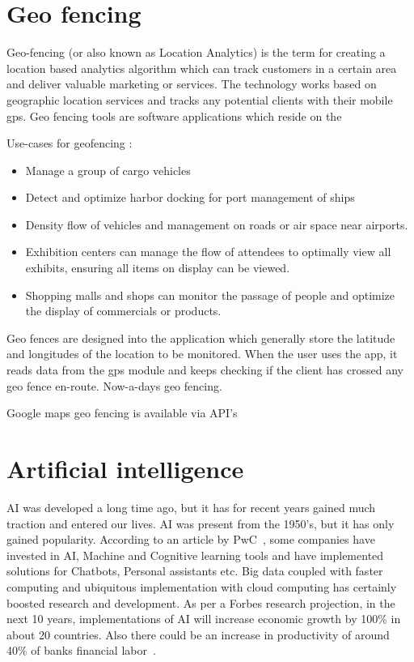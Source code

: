 %
%
%
%
\section{Geo fencing}
Geo-fencing (or also known as Location Analytics) is the term for creating a location based analytics algorithm which can track customers in a certain area and deliver valuable marketing or services. The technology works based on geographic location services and tracks any potential clients with their mobile gps. 
Geo fencing tools are software applications which reside on the 

Use-cases for geofencing :
\begin{itemize}
	\item Manage a group of cargo vehicles
	\item Detect and optimize harbor docking for port management of ships
	\item Density flow of vehicles and management on roads or air space near airports.
	\item Exhibition centers can manage the flow of attendees to optimally view all exhibits, ensuring all items on display can be viewed.
	\item Shopping malls and shops can monitor the passage of people and optimize the display of commercials or products.
\end{itemize}

Geo fences are designed into the application which generally store the latitude and longitudes of the location to be monitored. When the user uses the app, it reads data from the gps module and keeps checking if the client has crossed any geo fence en-route. Now-a-days geo fencing.

Google maps geo fencing is available via API's 

\newpage
\section{Artificial intelligence}
AI was developed a long time ago, but it has for recent years gained much traction and entered our lives. AI was present from the 1950's, but it has only gained popularity.
According to an article by PwC~, some companies have invested in AI, Machine and Cognitive learning tools and have implemented solutions for Chatbots, Personal assistants etc. Big data coupled with faster computing and ubiquitous implementation with cloud computing has certainly boosted research and development.
As per a Forbes research projection, in the next 10 years, implementations of AI will increase economic growth by 100\% in about 20 countries. Also there could be an increase in productivity of around 40\% of banks financial labor~.

